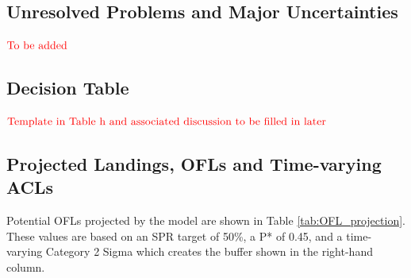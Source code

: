 \documentclass[12pt,]{article}
\begin{document}
\FloatBarrier

\hypertarget{unresolved-problems-and-major-uncertainties}{%
\subsection*{Unresolved Problems and Major
Uncertainties}\label{unresolved-problems-and-major-uncertainties}}

\textbf{\(\color{red}{\text{To be added}}\)}

\FloatBarrier

\hypertarget{decision-table}{%
\subsection*{Decision Table}\label{decision-table}}

\textbf{\(\color{red}{\text{Template in Table h and associated discussion to be filled in later}}\)}

\FloatBarrier

\hypertarget{projected-landings-ofls-and-time-varying-acls}{%
\subsection*{Projected Landings, OFLs and Time-varying
ACLs}\label{projected-landings-ofls-and-time-varying-acls}}

Potential OFLs projected by the model are shown in Table
\ref{tab:OFL_projection}. These values are based on an SPR target of
50\%, a P* of 0.45, and a time-varying Category 2 Sigma which creates
the buffer shown in the right-hand column.
\end{document}
